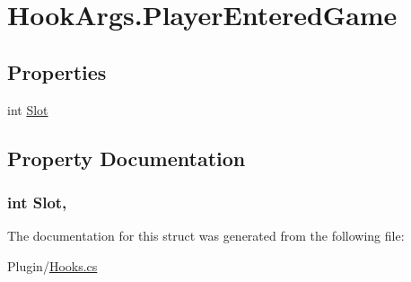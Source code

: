 \hypertarget{structOTA_1_1Plugin_1_1HookArgs_1_1PlayerEnteredGame}{}\section{Hook\+Args.\+Player\+Entered\+Game}
\label{structOTA_1_1Plugin_1_1HookArgs_1_1PlayerEnteredGame}
\subsection*{Properties}
\begin{DoxyCompactItemize}
\item 
int \hyperlink{structOTA_1_1Plugin_1_1HookArgs_1_1PlayerEnteredGame_a845a62ef01927ccc8bd45a41de3996f1}{Slot}
\end{DoxyCompactItemize}


\subsection{Property Documentation}
\hypertarget{structOTA_1_1Plugin_1_1HookArgs_1_1PlayerEnteredGame_a845a62ef01927ccc8bd45a41de3996f1}{}
\subsubsection[{Slot}]{\setlength{\rightskip}{0pt plus 5cm}int Slot\hspace{0.3cm}{\ttfamily [get]}, {\ttfamily [set]}}\label{structOTA_1_1Plugin_1_1HookArgs_1_1PlayerEnteredGame_a845a62ef01927ccc8bd45a41de3996f1}


The documentation for this struct was generated from the following file\+:\begin{DoxyCompactItemize}
\item 
Plugin/\hyperlink{Hooks_8cs}{Hooks.\+cs}\end{DoxyCompactItemize}
